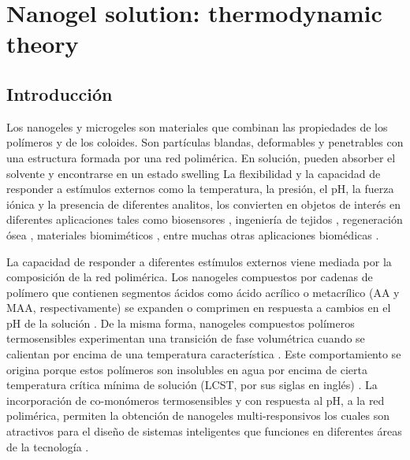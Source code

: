 \chapter{Nanogel solution: thermodynamic theory} \label{cap:mc:soluciones}
	
	\section{Introducci\'on}
	
	Los nanogeles y microgeles son materiales que combinan las propiedades de los pol\'imeros y de los coloides. Son part\'iculas blandas, deformables y penetrables con una estructura formada por una red polim\'erica. \cite{lyon2012polymer} En soluci\'on, pueden absorber el solvente y encontrarse en un estado swelling \cite{karg2019nanogels,perez2021thermodynamic}
	La flexibilidad y la capacidad de responder a est\'imulos externos como la temperatura, la presi\'on, el pH, la fuerza i\'onica y la presencia de diferentes analitos, los convierten en objetos de inter\'es en diferentes aplicaciones tales como biosensores \cite{zhang2012ultrathin,islam2014responsive}, ingenier\'ia de tejidos \cite{matricardi2013interpenetrating,van2011biopolymer}, regeneraci\'on \'osea \cite{bai2018bioactive}, materiales biomim\'eticos \cite{green2016mimicking,wu2010multifunctional}, entre muchas otras aplicaciones biom\'edicas \cite{Daly2020}. 
	
	La capacidad de responder a diferentes est\'imulos externos viene mediada por la composici\'on de la red polim\'erica.
	Los nanogeles compuestos por cadenas de pol\'imero que contienen segmentos \'acidos como \'acido acr\'ilico o metacr\'ilico (AA y MAA, respectivamente) se expanden o comprimen  en respuesta a cambios en el pH de la soluci\'on \cite{snowden1996colloidal,Zhou1998}.
	De la misma forma, nanogeles compuestos pol\'imeros termosensibles experimentan una transici\'on de fase volum\'etrica cuando se calientan por encima de una temperatura caracter\'istica \cite{Pelton1986,Pelton2000}.
	Este comportamiento se origina porque estos pol\'imeros son insolubles en agua por encima de cierta temperatura cr\'itica m\'inima  de soluci\'on (LCST, por sus siglas en ingl\'es) \cite{Kawaguchi2020}.
	La incorporaci\'on de co-mon\'omeros termosensibles y con respuesta al pH, a la red polim\'erica,  permiten la obtenci\'on de nanogeles multi-responsivos los cuales son atractivos para el dise\~no de sistemas inteligentes que funciones en diferentes \'areas de la tecnolog\'ia \cite{plamper2017functional}.	
	
